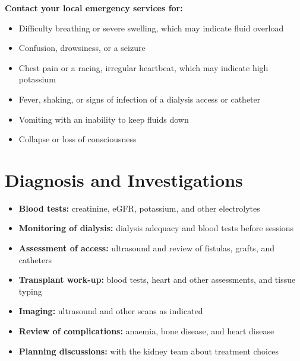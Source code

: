 \textbf{Contact your local emergency services for:}
\begin{itemize}
    \item Difficulty breathing or severe swelling, which may indicate fluid overload
    \item Confusion, drowsiness, or a seizure
    \item Chest pain or a racing, irregular heartbeat, which may indicate high potassium
    \item Fever, shaking, or signs of infection of a dialysis access or catheter
    \item Vomiting with an inability to keep fluids down
    \item Collapse or loss of consciousness
\end{itemize}

\section*{Diagnosis and Investigations}
\begin{itemize}
    \item \textbf{Blood tests:} creatinine, eGFR, potassium, and other electrolytes
    \item \textbf{Monitoring of dialysis:} dialysis adequacy and blood tests before sessions
    \item \textbf{Assessment of access:} ultrasound and review of fistulas, grafts, and catheters
    \item \textbf{Transplant work-up:} blood tests, heart and other assessments, and tissue typing
    \item \textbf{Imaging:} ultrasound and other scans as indicated
    \item \textbf{Review of complications:} anaemia, bone disease, and heart disease
    \item \textbf{Planning discussions:} with the kidney team about treatment choices
\end{itemize}

